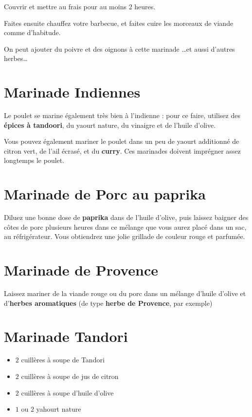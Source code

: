 Couvrir et mettre au frais pour au moins 2 heures.

Faites ensuite chauffez votre barbecue, et faites cuire les morceaux de viande comme d'habitude.


\begin{remarque}
On peut ajouter du poivre et des oignons à cette marinade \dots  et aussi d'autres herbes\dots
\end{remarque}

\section{Marinade Indiennes}
Le poulet se marine également très bien à l'indienne : pour ce faire, utilisez des \textbf{épices à tandoori}, du yaourt nature, du vinaigre et de l'huile d'olive.

Vous pouvez également mariner le poulet dans un peu de yaourt additionné de citron vert, de l'ail écrasé, et du \textbf{curry}. Ces marinades doivent imprégner assez longtemps le poulet.

\section{Marinade de Porc au paprika}
Diluez une bonne dose de \textbf{paprika} dans de l'huile d'olive, puis laissez baigner des côtes de porc plusieurs heures dans ce mélange que vous aurez placé dans un sac, au réfrigérateur. Vous obtiendrez une jolie grillade de couleur rouge et parfumée.

\section{Marinade de Provence}
Laissez mariner de la viande rouge ou du porc dans un mélange d'huile d'olive et d'\textbf{herbes aromatiques} (de type \textbf{herbe de Provence}, par exemple)

\section{Marinade Tandori}
\begin{itemize}
\item $2$ cuillères à soupe de Tandori
\item $2$ cuillères à soupe de jus de citron
\item $2$ cuillères à soupe d'huile d'olive
\item $1$ ou $2$ yahourt nature
\end{itemize}


